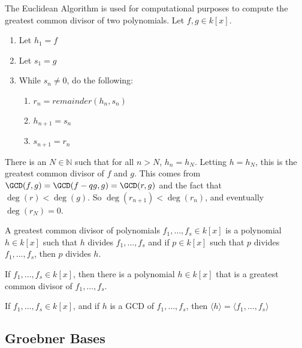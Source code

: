 \documentclass[crop=false,class=book,oneside]{standalone}
\begin{document}
\begin{remark}
The Euclidean Algorithm is used for computational purposes to compute the greatest common divisor of two polynomials. Let $f,g\in k[x]$.
\begin{enumerate}
    \item Let $h_{1}=f$
    \item Let $s_{1}=g$
    \item While $s_{n}\ne 0$, do the following:
    \begin{enumerate}
        \item $r_{n}=remainder(h_{n},s_{n})$
        \item $h_{n+1}=s_{n}$
        \item $s_{n+1}=r_{n}$
    \end{enumerate}
\end{enumerate}
There is an $N\in \mathbb{N}$ such that for all $n>N$, $h_n = h_N$. Letting $h = h_N$, this is the greatest common divisor of $f$ and $g$. This comes from $\GCD(f,g)=\GCD(f-qg,g)=\GCD(r,g)$ and the fact that $\deg(r)<\deg(g)$. So $\deg(r_{n+1})<\deg(r_{n})$, and eventually $\deg(r_{N})=0$.
\end{remark}
\begin{definition}
A greatest common divisor of polynomials $f_1,\hdots, f_s \in k[x]$ is a polynomial $h\in k[x]$ such that $h$ divides $f_1,\hdots, f_s$ and if $p\in k[x]$ such that $p$ divides $f_1,\hdots, f_s$, then $p$ divides $h$.
\end{definition}
\begin{theorem}
If $f_{1},\hdots, f_{s}\in k[x]$, then there is a polynomial $h\in k[x]$ that is a greatest common divisor of $f_{1},\hdots,f_{s}$.
\end{theorem}
\begin{theorem}
If $f_{1},\hdots,f_{s}\in k[x]$, and if $h$ is a GCD of $f_{1},\hdots, f_{s}$, then $\langle h\rangle=\langle f_{1},\hdots, f_{s}\rangle$
\end{theorem}
\subsection{Groebner Bases}
\end{document}
